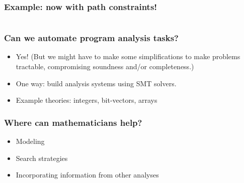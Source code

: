 \documentclass[11pt,table]{beamer}
\begin{document}
\begin{frame}
  \frametitle{Example: now with path constraints!}
  \begin{columns}
\end{columns}
  
\end{frame}

 \begin{frame}
\frametitle{Can we automate program analysis tasks?}
\begin{itemize}
\item{Yes! (But we might have to make some simplifications to make problems tractable, compromising soundness and/or completeness.)}
  \medskip
  \item{One way: build analysis systems using SMT solvers.}
    \medskip
  \item{Example theories: integers, bit-vectors, arrays}
      \end{itemize}
  \end{frame}

  

\begin{frame}
\frametitle{Where can mathematicians help?}
\begin{itemize}
\item{Modeling}
  \medskip
\item{Search strategies}
  \medskip
\item{Incorporating information from other analyses}
  \end{itemize}
\end{frame}
\end{document}
